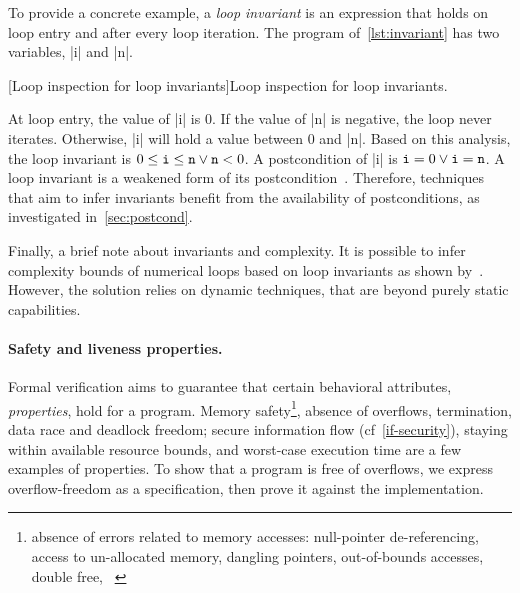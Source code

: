 To provide a concrete example, a \emph{loop invariant} is an expression that holds on loop entry and after every loop iteration.
The program of~\autoref{lst:invariant} has two variables, \pr|i| and \pr|n|.

\begin{center}
\begin{minipage}{\textwidth}
\captionsetup{type=lstlisting}
[Loop inspection for loop invariants]{Loop inspection for loop invariants.}
\label{lst:invariant}
\end{minipage}
\end{center}

At loop entry, the value of \pr|i| is 0.
If the value of \pr|n| is negative, the loop never iterates.
Otherwise, \pr|i| will hold a value between 0 and \pr|n|.
Based on this analysis, the loop invariant is \(0 \leq \prm{i} \leq \prm{n} \vee \prm{n} < 0\).
A postcondition of \pr|i| is \(\prm{i}=0 \vee \prm{i}=\prm{n}\).
A loop invariant is a {weakened} form of its postcondition~\cite{furia2010}.
Therefore, techniques that aim to infer invariants benefit from the availability of postconditions, as investigated in~\autoref{sec:postcond}.

Finally, a brief note about invariants and complexity.
It is possible to infer complexity bounds of numerical loops based on loop invariants as shown by~\textcite{nguyen2017}.
However, the solution relies on dynamic techniques, that are beyond purely static capabilities.

\paragraph*{Safety and liveness properties.}
Formal verification aims to guarantee that certain behavioral attributes, \ie \emph{properties}, hold for a program.
Memory safety\footnote{
\Ie absence of errors related to memory accesses: null-pointer de-referencing, access to un-allocated memory, dangling pointers, out-of-bounds accesses, double free, \etc~\cite{muller2024}},
absence of overflows, termination, data race and deadlock freedom;
secure information flow (cf~\autoref{if-security}), staying within available resource bounds, and worst-case execution time are a few examples of properties.
To show that a program is free of \eg overflows, we express {overflow-freedom} as a specification,
then prove it against the implementation.

